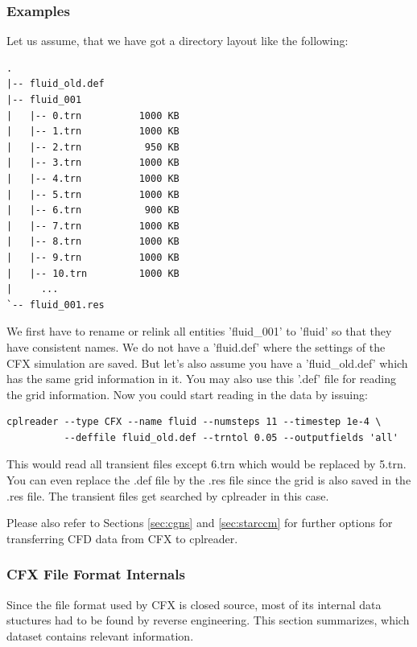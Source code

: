 \documentclass[a4paper,10pt]{article}
\begin{document}
\subsubsection{Examples}

Let us assume, that we have got a directory layout like the following:

\begin{verbatim}
.
|-- fluid_old.def
|-- fluid_001
|   |-- 0.trn          1000 KB
|   |-- 1.trn          1000 KB
|   |-- 2.trn           950 KB
|   |-- 3.trn          1000 KB
|   |-- 4.trn          1000 KB
|   |-- 5.trn          1000 KB
|   |-- 6.trn           900 KB
|   |-- 7.trn          1000 KB
|   |-- 8.trn          1000 KB
|   |-- 9.trn          1000 KB
|   |-- 10.trn         1000 KB
|     ...
`-- fluid_001.res
\end{verbatim}

We first have to rename or relink all entities 'fluid\_001' to 'fluid' so that
they have consistent  names.  We do not have a  'fluid.def' where the settings
of  the  CFX  simulation  are  saved.   But  let's  also  assume  you  have  a
'fluid\_old.def' which has the same grid  information in it.  You may also use
this  '.def' file  for  reading the  grid  information.  Now  you could  start
reading in the data by issuing:

\begin{verbatim}
cplreader --type CFX --name fluid --numsteps 11 --timestep 1e-4 \
          --deffile fluid_old.def --trntol 0.05 --outputfields 'all'
\end{verbatim}

This would  read all transient files  except 6.trn which would  be replaced by
5.trn.  You can even replace the .def  file by the .res file since the grid is
also saved in the .res file.  The transient files get searched by cplreader in
this case.

Please also refer to Sections \ref{sec:cgns} and \ref{sec:starccm} for further
options for transferring CFD data from CFX to cplreader.

\subsubsection{CFX File Format Internals}
Since the file format used by CFX is closed source, most of its internal data
stuctures had to be found by reverse engineering. This section summarizes,
which dataset contains relevant information.
\end{document}
